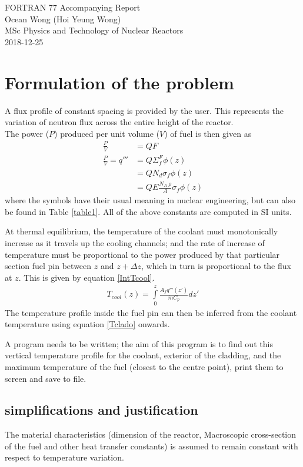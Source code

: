 \documentclass[a4paper, 12pt]{article}
\begin{document}
\begin{center}
FORTRAN 77 Accompanying Report					\\
Ocean Wong (Hoi Yeung Wong)						\\
MSc Physics and Technology of Nuclear Reactors	\\
2018-12-25										\\
\end{center}

\section{Formulation of the problem}
A flux profile of constant spacing is provided by the user. This represents the variation of neutron flux across the entire height of the reactor.\\
The power ($P$) produced per unit volume ($V$) of fuel is then given as
\begin{align}
\frac{P}{V} &=  Q F  							\label{FirstEq} \\
\frac{P}{V} =q''' &= Q \Sigma_f^F \phi(z)						\\
  &= Q N_d \sigma_f \phi(z) 						\\
  &= Q E \frac{N_A \:\rho}{A} \sigma_f \phi(z) \label{ExpandedQ'''}
\end{align}
where the symbols have their usual meaning in nuclear engineering, but can also be found in Table \ref{table1}.
All of the above constants are computed in SI units.

At thermal equilibrium, the temperature of the coolant must monotonically increase as it travels up the cooling channels; and the rate of increase of temperature must be proportional to the power produced by that particular section fuel pin between $z$ and $z+\Delta z$, which in turn is proportional to the flux at $z$. This is given by equation \ref{IntTcool}.
\begin{align}
	T_{cool}(z)=\int\limits_{0}^{z} \frac{A_f q'''(z')}{\dot{m}C_p} dz'
	\label{IntTcool}
\end{align}
The temperature profile inside the fuel pin can then be inferred from the coolant temperature using equation \ref{Tclado} onwards.

A program needs to be written; the aim of this program is to find out this vertical temperature profile for the coolant, exterior of the cladding, and the maximum temperature of the fuel (closest to the centre point), print them to screen and save to file.

\subsection{simplifications and justification}
The material characteristics (dimension of the reactor, Macroscopic cross-section of the fuel and other heat transfer constants) is assumed to remain constant with respect to temperature variation.\\
\end{document}
